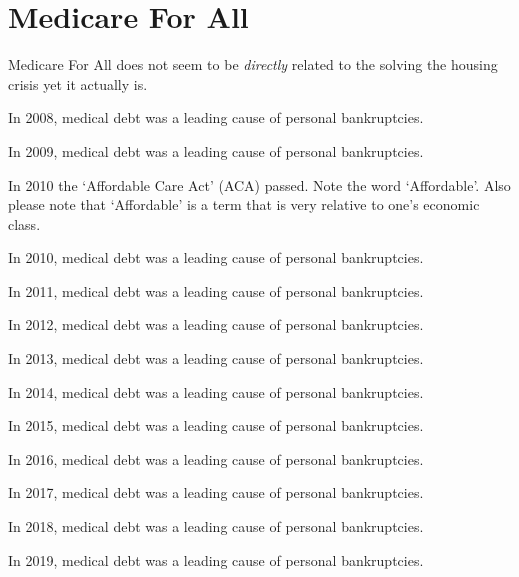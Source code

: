 \section{Medicare For All}

Medicare For All does not seem to be \emph{directly} related to the solving the housing crisis yet it actually is.

\bigskip

In 2008, medical debt was a leading cause of personal bankruptcies.

\bigskip

In 2009, medical debt was a leading cause of personal bankruptcies.

\bigskip

In 2010 the `Affordable Care Act' (ACA) passed. Note the word `Affordable'. Also please note that `Affordable' is a term that is very relative to one's economic class.

\bigskip

In 2010, medical debt was a leading cause of personal bankruptcies.

\bigskip

In 2011, medical debt was a leading cause of personal bankruptcies.

\bigskip

In 2012, medical debt was a leading cause of personal bankruptcies.

\bigskip

In 2013, medical debt was a leading cause of personal bankruptcies.

\bigskip

In 2014, medical debt was a leading cause of personal bankruptcies.

\bigskip

In 2015, medical debt was a leading cause of personal bankruptcies.

\bigskip

In 2016, medical debt was a leading cause of personal bankruptcies.

\bigskip

In 2017, medical debt was a leading cause of personal bankruptcies.

\bigskip

In 2018, medical debt was a leading cause of personal bankruptcies.

\bigskip

In 2019, medical debt was a leading cause of personal bankruptcies.

\bigskip

